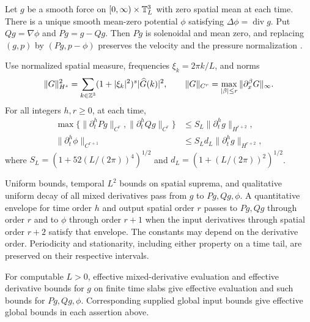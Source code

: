 \begin{proposition}\label{prop:projection-l2}
Let $g$ be a smooth force on $[0,\infty)\times\mathbb T_L^3$ with zero
spatial mean at each time. There is a unique smooth mean-zero potential
$\phi$ satisfying $\Delta\phi=\operatorname{div}g$. Put
$Qg=\nabla\phi$ and $Pg=g-Qg$. Then $Pg$ is solenoidal and mean zero,
and replacing $(g,p)$ by $(Pg,p-\phi)$ preserves the velocity and the
pressure normalization \cite{ConstantinFoias1988,Galdi2011}.

Use normalized spatial measure, frequencies $\xi_k=2\pi k/L$, and norms
\[
 \|G\|_{H^s}^2=\sum_{k\in\mathbb Z^3}(1+|\xi_k|^2)^s|\widehat G(k)|^2,
 \qquad
 \|G\|_{C^r}=\max_{|\beta|\le r}\|\partial_x^\beta G\|_\infty.
\]
For all integers $h,r\ge0$, at each time,
\begin{equation}\label{eq:projection-estimate}
 \begin{aligned}
 \max\{\|\partial_t^h Pg\|_{C^r},\|\partial_t^h Qg\|_{C^r}\}
     &\le S_L\|\partial_t^h g\|_{H^{r+2}},\\
 \|\partial_t^h\phi\|_{C^{r+1}}
     &\le S_Ld_L\|\partial_t^h g\|_{H^{r+2}},
 \end{aligned}
\end{equation}
where $S_L=(1+52(L/(2\pi))^4)^{1/2}$ and
$d_L=(1+(L/(2\pi))^2)^{1/2}$.

Uniform bounds, temporal $L^2$ bounds on spatial suprema, and qualitative
uniform decay of all mixed derivatives pass from $g$ to $Pg,Qg,\phi$.
A quantitative envelope for time order $h$ and output spatial order $r$
passes to $Pg,Qg$ through order $r$ and to $\phi$ through order $r+1$
when the input derivatives through spatial order $r+2$ satisfy that
envelope. The constants may depend on the derivative order.
Periodicity and stationarity, including either property on a time tail,
are preserved on their respective intervals.

For computable $L>0$, effective mixed-derivative evaluation and effective
derivative bounds for $g$ on finite time slabs give effective evaluation
and such bounds for $Pg,Qg,\phi$. Corresponding supplied global input
bounds give effective global bounds in each assertion above.
\end{proposition}
